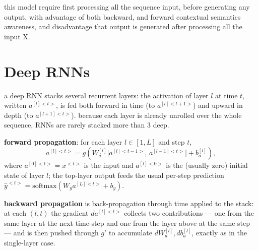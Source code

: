 \documentclass[4apaper,12pt]{book}
\begin{document}
\begin{description}
\begin{description}

    \item this model require first processing all the sequence input, before generating any output, with advantage of both backward, and forward contextual semantics awareness, and disadvantage that output is generated after processing all the input X.
    \end{description}
    \section{Deep RNNs}
    \begin{description}
    \item a deep RNN stacks several recurrent layers: the activation of layer $l$ at time $t$, written $a^{[l]<t>}$, is fed both forward in time (to $a^{[l]<t+1>}$) and upward in depth (to $a^{[l+1]<t>}$). because each layer is already unrolled over the whole sequence, RNNs are rarely stacked more than 3 deep.
    \item \textbf{forward propagation}: for each layer $l\in[1,L]$ and step $t$, $$a^{[l]<t>}=g\!\left(W_a^{[l]}\big[a^{[l]<t-1>},\,a^{[l-1]<t>}\big]+b_a^{[l]}\right),$$ where $a^{[0]<t>}=x^{<t>}$ is the input and $a^{[l]<0>}$ is the (usually zero) initial state of layer $l$; the top-layer output feeds the usual per-step prediction $\hat{y}^{<t>}=\text{softmax}(W_y a^{[L]<t>}+b_y)$.
    \item \textbf{backward propagation} is back-propagation through time applied to the stack: at each $(l,t)$ the gradient $da^{[l]<t>}$ collects two contributions --- one from the same layer at the next time-step and one from the layer above at the same step --- and is then pushed through $g'$ to accumulate $dW_a^{[l]},db_a^{[l]}$, exactly as in the single-layer case.
    \end{description}
  \end{description}
\end{document}

